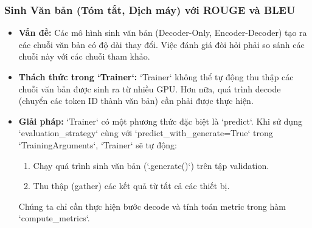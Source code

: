 \subsubsection{Sinh Văn bản (Tóm tắt, Dịch máy) với ROUGE và BLEU}
\begin{itemize}
    \item \textbf{Vấn đề:} Các mô hình sinh văn bản (Decoder-Only, Encoder-Decoder) tạo ra các chuỗi văn bản có độ dài thay đổi. Việc đánh giá đòi hỏi phải so sánh các chuỗi này với các chuỗi tham khảo.
    \item \textbf{Thách thức trong `Trainer`:} `Trainer` không thể tự động thu thập các chuỗi văn bản được sinh ra từ nhiều GPU. Hơn nữa, quá trình decode (chuyển các token ID thành văn bản) cần phải được thực hiện.
    \item \textbf{Giải pháp:} `Trainer` có một phương thức đặc biệt là `predict`. Khi sử dụng `evaluation\_strategy` cùng với `predict\_with\_generate=True` trong `TrainingArguments`, `Trainer` sẽ tự động:
        \begin{enumerate}
            \item Chạy quá trình sinh văn bản (`.generate()`) trên tập validation.
            \item Thu thập (gather) các kết quả từ tất cả các thiết bị.
        \end{enumerate}
        Chúng ta chỉ cần thực hiện bước decode và tính toán metric trong hàm `compute\_metrics`.
\end{itemize}

